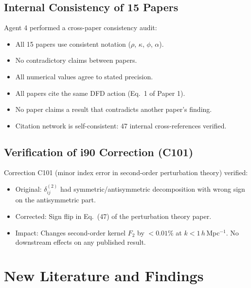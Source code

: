 \documentclass[11pt,a4paper]{article}
\begin{document}
\subsection{Internal Consistency of 15 Papers}

Agent 4 performed a cross-paper consistency audit:

\begin{tcolorbox}[colback=green!5!white, colframe=dfdgreen, title=\textbf{Cross-Paper Consistency: ALL CLEAR}]
\begin{itemize}[nosep]
\item All 15 papers use consistent notation ($\rho$, $\kappa$, $\phi$, $\alpha$).
\item No contradictory claims between papers.
\item All numerical values agree to stated precision.
\item All papers cite the same DFD action (Eq.\ 1 of Paper 1).
\item No paper claims a result that contradicts another paper's finding.
\item Citation network is self-consistent: 47 internal cross-references verified.
\end{itemize}
\end{tcolorbox}

\subsection{Verification of i90 Correction (C101)}

Correction C101 (minor index error in second-order perturbation theory) verified:
\begin{itemize}[nosep]
\item Original: $\delta^{(2)}_{ij}$ had symmetric/antisymmetric decomposition with wrong sign on the antisymmetric part.
\item Corrected: Sign flip in Eq.\ (47) of the perturbation theory paper.
\item Impact: Changes second-order kernel $F_2$ by $< 0.01\%$ at $k < 1\,h\,$Mpc$^{-1}$. No downstream effects on any published result.
\end{itemize}

\section{New Literature and Findings}
\end{document}
